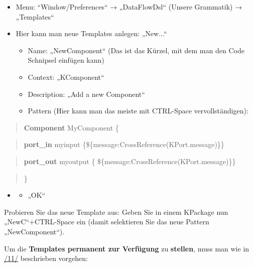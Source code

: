 \documentclass[]{article}
\providecommand{\tightlist}{%
  \setlength{\itemsep}{0pt}\setlength{\parskip}{0pt}}
\begin{document}
\begin{itemize}
\item
  Menu: ``Window/Preferences`` → „DataFlowDsl`` (Unsere Grammatik) →
  „Templates``
\item
  Hier kann man neue Templates anlegen: „New...``

  \begin{itemize}
  \tightlist
  \item
    Name: „NewComponent`` (Das ist das Kürzel, mit dem man den Code
    Schnipsel einfügen kann)
  \item
    Context: „KComponent``
  \item
    Description: „Add a new Component``
  \item
    Pattern (Hier kann man das meiste mit CTRL-Space vervollständigen):
  \end{itemize}
\end{itemize}

\begin{quote}
\textbf{Component} MyComponent \{
\end{quote}

\begin{quote}
\textbf{port\_in} myinput
\{\$\{message:CrossReference(KPort.message)\}\}
\end{quote}

\begin{quote}
\textbf{port\_out} myoutput \{
\$\{message:CrossReference(KPort.message)\}\}
\end{quote}

\begin{quote}
\}
\end{quote}

\begin{itemize}
\item
  \begin{itemize}
  \tightlist
  \item
    „OK``
  \end{itemize}
\end{itemize}

Probieren Sie das neue Template aus: Geben Sie in einem KPackage nun
„NewC``+CTRL-Space ein (damit selektieren Sie das neue Pattern
„NewComponent``).

Um die \textbf{Templates permanent zur Verfügung }zu \textbf{stellen},
muss man wie in \protect\hyperlink{anchor-13}{/11/} beschrieben
vorgehen:
\end{document}
